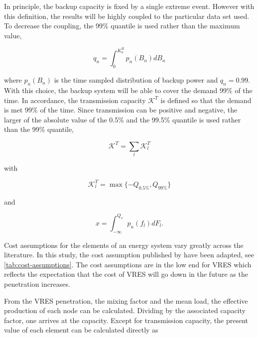 \documentclass[a4paper, 12pt, sort&compress]{elsarticle}%
\begin{document}
In principle, the backup capacity is fixed by a single extreme
event. However with this definition, the results will be highly
coupled to the particular data set used. To decrease the coupling, the
99\% quantile is used rather than the maximum value,

\begin{equation}
  \label{eq:2}
  q_{n} = \int _{0} ^{K_{n}^{B}} p_{n}(B_{n})dB_{n}
\end{equation}

where $p_{n}(B_{n})$ is the time sampled distribution of backup power
and $q_{n} = 0.99$. With this choice, the backup system will be able
to cover the demand 99\% of the time. In accordance, the transmission
capacity $\mathcal{K}^{T}$ is defined so that the demand is met 99\%
of the time. Since transmission can be positive and negative, the
larger of the absolute value of the 0.5\% and the 99.5\% quantile is
used rather than the 99\% quantile,

\begin{equation}
  \label{eq:4}
  \mathcal{K}^{T} = \sum_{l} \mathcal{K}^{T}_{l} 
\end{equation}

with

\begin{equation}
  \label{eq:4}
  \mathcal{K}_{l}^{T} = \max \{-Q_{0.5\%} , Q_{99\%} \}
\end{equation}

and 

\begin{equation}
  \label{eq:4}
  x = \int_{-\infty}^{Q_{x}} p_{n}(f_{l}) dF_{l} .
\end{equation}

Cost assumptions for the elements of an energy system vary greatly
across the literature\cite{Sensitivity}. In this study, the cost assumption published by
\cite{Rolando} have been adapted, see \cref{tab:cost-assumptions}. The cost
assumptions are in the low end for VRES which reflects the expectation
that the cost of VRES will go down in the future as the penetration
increases\cite{Fraunhofer}.



From the VRES penetration, the mixing factor and the mean load, the
effective production of each node can be calculated. Dividing by the
associated capacity factor, one arrives at the capacity. Except for
transmission capacity, the present value of each element can be
calculated directly as
\end{document}
